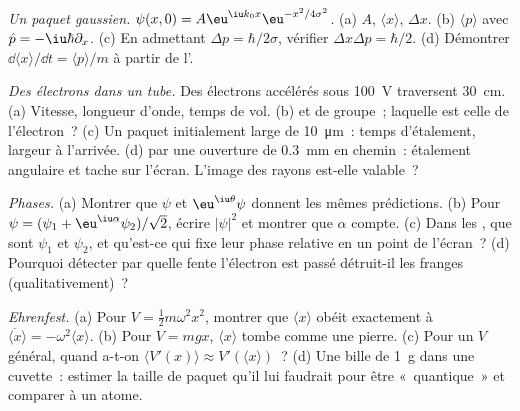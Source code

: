 \begin{exercise}[$\star\star$]\label{exo:b2:schrodinger-wave-functions:6}
\emph{Un paquet gaussien.} $\psi(x,0) = A\eu^{\iu k_0x}\eu^{-x^2/4\sigma^2}$. (a)
$A$, $\langle x\rangle$, $\Delta x$. (b) $\langle p\rangle$ avec $\hat p =
-\iu\hbar\partial_x$. (c) En admettant $\Delta p = \hbar/2\sigma$, vérifier
$\Delta x\Delta p = \hbar/2$. (d) Démontrer $\dd\langle x\rangle/\dd t = \langle
p\rangle/m$ à partir de l'.
\end{exercise}

\begin{exercise}[$\star\star$]\label{exo:b2:schrodinger-wave-functions:7}
\emph{Des électrons dans un tube.} Des électrons accélérés sous \qty{100}{V}
traversent \qty{30}{cm}. (a) Vitesse, longueur d'onde, temps de vol. (b)  et
de groupe~; laquelle est celle de l'électron~? (c) Un paquet initialement
large de \qty{10}{\micro m}~: temps d'étalement, largeur à l'arrivée. (d) 
par une ouverture de \qty{0.3}{mm} en chemin~: étalement angulaire et tache sur
l'écran. L'image des rayons est-elle valable~?
\end{exercise}

\begin{exercise}[$\star\star$]\label{exo:b2:schrodinger-wave-functions:8}
\emph{Phases.} (a) Montrer que $\psi$ et $\eu^{\iu\theta}\psi$ donnent les mêmes
prédictions. (b) Pour $\psi = (\psi_1 + \eu^{\iu\alpha}\psi_2)/\sqrt2$, écrire
$|\psi|^2$ et montrer que $\alpha$ compte. (c) Dans les , que
sont $\psi_1$ et $\psi_2$, et qu'est-ce qui fixe leur phase relative en un point
de l'écran~? (d) Pourquoi détecter par quelle fente l'électron est passé
détruit-il les franges (qualitativement)~?
\end{exercise}

\begin{exercise}[$\star\star$]\label{exo:b2:schrodinger-wave-functions:9}
\emph{Ehrenfest.} (a) Pour $V = \tfrac12m\omega^2x^2$, montrer que $\langle
x\rangle$ obéit exactement à $\ddot{\langle x\rangle} = -\omega^2\langle x\rangle$.
(b) Pour $V = mgx$, $\langle x\rangle$ tombe comme une pierre. (c) Pour un
$V$ général, quand a-t-on $\langle V'(x)\rangle \approx V'(\langle x\rangle)$~? (d) Une
bille de \qty{1}{g} dans une cuvette~: estimer la taille de paquet qu'il lui faudrait
pour être «~quantique~» et comparer à un atome.
\end{exercise}

